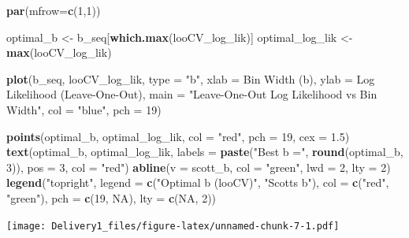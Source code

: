\documentclass[
]{article}
\newenvironment{Shaded}{\begin{snugshade}}{\end{snugshade}}
\newcommand{\AttributeTok}[1]{\textcolor[rgb]{0.13,0.29,0.53}{#1}}
\newcommand{\ConstantTok}[1]{\textcolor[rgb]{0.56,0.35,0.01}{#1}}
\newcommand{\DecValTok}[1]{\textcolor[rgb]{0.00,0.00,0.81}{#1}}
\newcommand{\FloatTok}[1]{\textcolor[rgb]{0.00,0.00,0.81}{#1}}
\newcommand{\FunctionTok}[1]{\textcolor[rgb]{0.13,0.29,0.53}{\textbf{#1}}}
\newcommand{\NormalTok}[1]{#1}
\newcommand{\OtherTok}[1]{\textcolor[rgb]{0.56,0.35,0.01}{#1}}
\newcommand{\StringTok}[1]{\textcolor[rgb]{0.31,0.60,0.02}{#1}}
\begin{document}
\begin{Shaded}
\begin{Highlighting}[]
\FunctionTok{par}\NormalTok{(}\AttributeTok{mfrow=}\FunctionTok{c}\NormalTok{(}\DecValTok{1}\NormalTok{,}\DecValTok{1}\NormalTok{))}

\NormalTok{optimal\_b }\OtherTok{\textless{}{-}}\NormalTok{ b\_seq[}\FunctionTok{which.max}\NormalTok{(looCV\_log\_lik)]}
\NormalTok{optimal\_log\_lik }\OtherTok{\textless{}{-}} \FunctionTok{max}\NormalTok{(looCV\_log\_lik)}

\FunctionTok{plot}\NormalTok{(b\_seq, looCV\_log\_lik, }\AttributeTok{type =} \StringTok{"b"}\NormalTok{, }\AttributeTok{xlab =} \StringTok{\textquotesingle{}Bin Width (b)\textquotesingle{}}\NormalTok{, }\AttributeTok{ylab =} \StringTok{\textquotesingle{}Log Likelihood (Leave{-}One{-}Out)\textquotesingle{}}\NormalTok{,}
     \AttributeTok{main =} \StringTok{"Leave{-}One{-}Out Log Likelihood vs Bin Width"}\NormalTok{, }\AttributeTok{col =} \StringTok{"blue"}\NormalTok{, }\AttributeTok{pch =} \DecValTok{19}\NormalTok{)}

\FunctionTok{points}\NormalTok{(optimal\_b, optimal\_log\_lik, }\AttributeTok{col =} \StringTok{"red"}\NormalTok{, }\AttributeTok{pch =} \DecValTok{19}\NormalTok{, }\AttributeTok{cex =} \FloatTok{1.5}\NormalTok{)}
\FunctionTok{text}\NormalTok{(optimal\_b, optimal\_log\_lik, }\AttributeTok{labels =} \FunctionTok{paste}\NormalTok{(}\StringTok{"Best b ="}\NormalTok{, }\FunctionTok{round}\NormalTok{(optimal\_b, }\DecValTok{3}\NormalTok{)), }\AttributeTok{pos =} \DecValTok{3}\NormalTok{, }\AttributeTok{col =} \StringTok{"red"}\NormalTok{)}
\FunctionTok{abline}\NormalTok{(}\AttributeTok{v =}\NormalTok{ scott\_b, }\AttributeTok{col =} \StringTok{"green"}\NormalTok{, }\AttributeTok{lwd =} \DecValTok{2}\NormalTok{, }\AttributeTok{lty =} \DecValTok{2}\NormalTok{)}
\FunctionTok{legend}\NormalTok{(}\StringTok{"topright"}\NormalTok{, }\AttributeTok{legend =} \FunctionTok{c}\NormalTok{(}\StringTok{"Optimal b (looCV)"}\NormalTok{, }\StringTok{"Scott\textquotesingle{}s b"}\NormalTok{), }\AttributeTok{col =} \FunctionTok{c}\NormalTok{(}\StringTok{"red"}\NormalTok{, }\StringTok{"green"}\NormalTok{), }\AttributeTok{pch =} \FunctionTok{c}\NormalTok{(}\DecValTok{19}\NormalTok{, }\ConstantTok{NA}\NormalTok{), }\AttributeTok{lty =} \FunctionTok{c}\NormalTok{(}\ConstantTok{NA}\NormalTok{, }\DecValTok{2}\NormalTok{))}
\end{Highlighting}
\end{Shaded}

\texttt{[image: Delivery1\_files/figure-latex/unnamed-chunk-7-1.pdf]}
\end{document}
